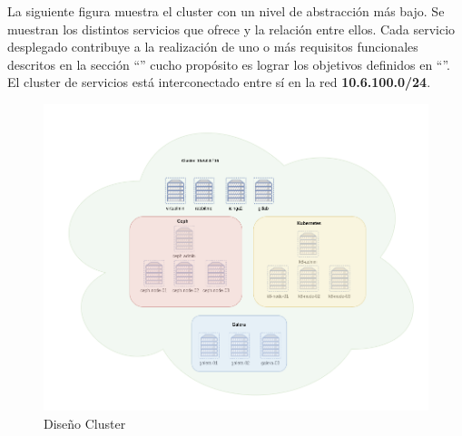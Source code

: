 \begin{text}
	La siguiente figura muestra el cluster con un nivel de abstracción más bajo. Se muestran los distintos servicios que ofrece y la relación entre ellos. Cada servicio desplegado contribuye a la realización de uno o más requisitos funcionales descritos en la sección ``'' cucho propósito es lograr los objetivos definidos en ``''. \\
	El cluster de servicios está interconectado entre sí en la red \textbf{10.6.100.0/24}.
\end{text}
\begin{figure}[!hbt]
	\centering
	\includegraphics[scale=0.40]{imagenes/Diseno/diagrama_cluster_2.png}
	\caption[Diseño Cluster]{Diseño Cluster} 
	\label{cluster_design}
\end{figure}


